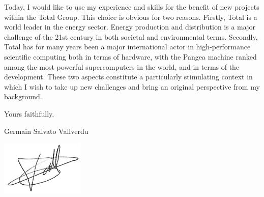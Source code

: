 \documentclass[11pt,a4paper,ragged2e]{../alta_letter}
\begin{document}
 
Today, I would like to use my experience and skills for the benefit of new projects within the Total Group. This choice is obvious for two reasons. Firstly, Total is a world leader in the energy sector. Energy production and distribution is a major challenge of the 21st century in both societal and environmental terms. Secondly, Total has for many years been a major international actor in high-performance scientific computing both in terms of hardware, with the Pangea machine ranked among the most powerful supercomputers in the world, and in terms of the development. These two aspects constitute a particularly stimulating context in which I wish to take up new challenges and bring an original perspective from my background.

Yours faithfully.

\vspace{1cm}

\hspace{.6\textwidth}Germain Salvato Vallverdu

\hspace{.6\textwidth}\includegraphics[width=4cm]{../maSignature}
\end{document}
